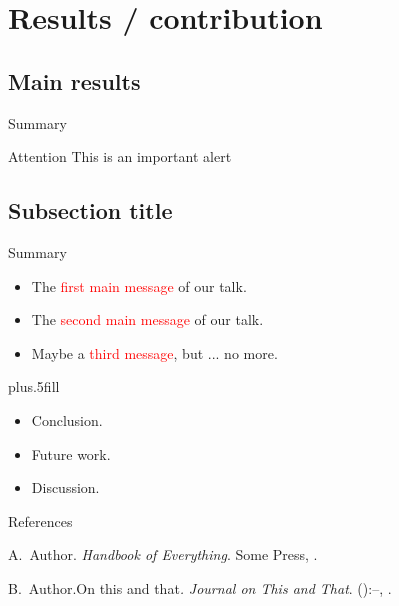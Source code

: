 \documentclass{beamer}
\begin{document}
\section{Results / contribution}

\subsection{Main results}

\begin{frame}{Summary}
   	\begin{alertblock}{Attention}
   		\textlatin{This is an important alert}
   	\end{alertblock}
\end{frame}

%
\subsection{Subsection title}

\begin{frame}{Summary}
	\begin{itemize}
		\item The \textcolor{red}{first main message} of our talk.
		\item The \textcolor{red}{second main message} of our talk.
		\item Maybe a \textcolor{red}{third message}, but ... no more.
	\end{itemize}
	\vskip0pt plus.5fill
	\begin{itemize}
		\item Conclusion.
	\end{itemize}
	\begin{itemize}
		\item Future work.
		\item Discussion.
	\end{itemize}
\end{frame}

\begin{frame}{References}
	\begin{thebibliography}{2}
		\beamertemplatebookbibitems
		A.\ Author. \newblock\emph{Handbook of Everything}.\newblock
\textlatin{Some Press, }.

		\beamertemplatearticlebibitems
		B.\ Author.\newblock On this and that\emph{.}
\newblock\emph{Journal on This and That}. 
():--, 
.
	\end{thebibliography}
\end{frame}
\fi
\end{document}
